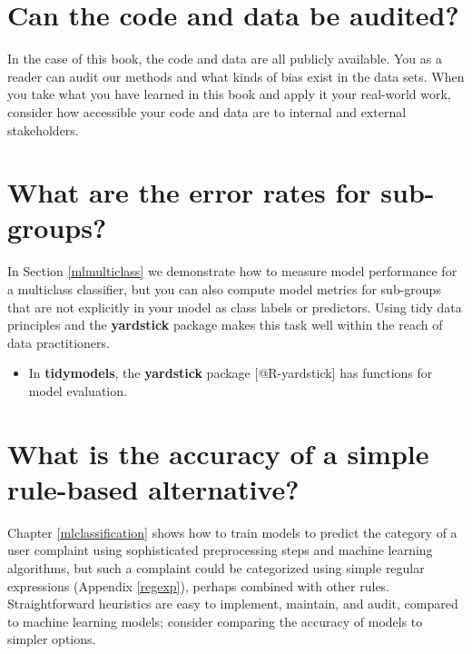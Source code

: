 \documentclass[
]{krantz}
\newenvironment{rmdblock}[1]
  {\begin{shaded*}
  \begin{itemize}[left = -1cm, labelsep = 1cm]
  \renewcommand{\labelitemi}{
    \raisebox{-.7\height}[0pt][0pt]{
      {\setkeys{Gin}{width=3em,keepaspectratio}\texttt{[image: images/\#1]}}
    }
  }
 
  \item
  }
  {
  \end{itemize}
  \end{shaded*}
  }
\newenvironment{rmdpackage}
  {\begin{rmdblock}{package}}
  {\end{rmdblock}}
\begin{document}
\hypertarget{can-the-code-and-data-be-audited}{%
\section*{Can the code and data be audited?}\label{can-the-code-and-data-be-audited}}


In the case of this book, the code and data are all publicly available. You as a reader can audit our methods and what kinds of bias exist in the data sets. When you take what you have learned in this book and apply it your real-world work, consider how accessible your code and data are to internal and external stakeholders.

\hypertarget{what-are-the-error-rates-for-sub-groups}{%
\section*{What are the error rates for sub-groups?}\label{what-are-the-error-rates-for-sub-groups}}


\thispagestyle{myheadings}

In Section \ref{mlmulticlass} we demonstrate how to measure model performance for a multiclass classifier, but you can also compute model metrics for sub-groups that are not explicitly in your model as class labels or predictors. Using tidy data principles and the \textbf{yardstick} package makes this task well within the reach of data practitioners.

\begin{rmdpackage}
In \textbf{tidymodels}, the \textbf{yardstick} package
{[}@R-yardstick{]} has functions for model evaluation.
\end{rmdpackage}

\hypertarget{what-is-the-accuracy-of-a-simple-rule-based-alternative}{%
\section*{What is the accuracy of a simple rule-based alternative?}\label{what-is-the-accuracy-of-a-simple-rule-based-alternative}}


Chapter \ref{mlclassification} shows how to train models to predict the category of a user complaint using sophisticated preprocessing steps and machine learning algorithms, but such a complaint could be categorized using simple regular expressions (Appendix \ref{regexp}), perhaps combined with other rules. Straightforward heuristics are easy to implement, maintain, and audit, compared to machine learning models; consider comparing the accuracy of models to simpler options.
\end{document}
